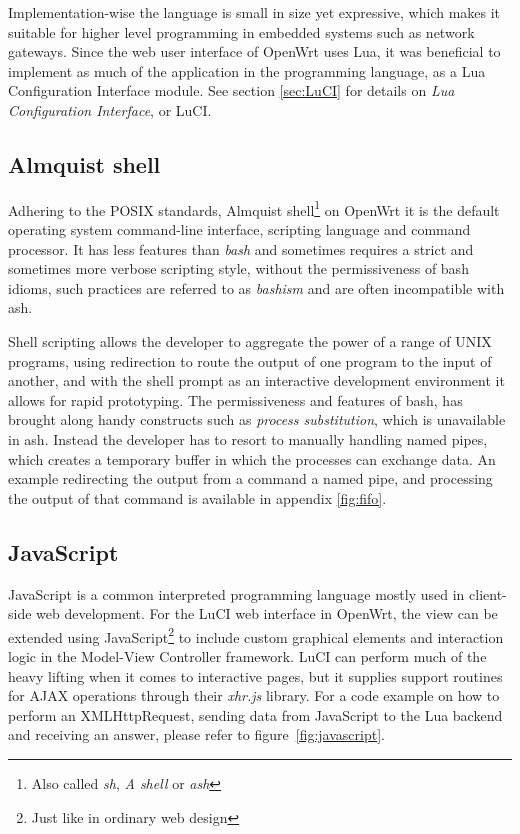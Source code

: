 \documentclass[a4paper,11pt,makeidx]{kth-bcs}
\begin{document}
Implementation-wise the language is small in size yet expressive, which makes it suitable for higher level programming in embedded systems such as network gateways.
Since the web user interface of OpenWrt uses Lua, it was beneficial to implement as much of the application in the programming language, as a Lua Configuration Interface module.
See section \ref{sec:LuCI} for details on \emph{Lua Configuration Interface}, or LuCI.

\subsection{Almquist shell}
Adhering to the POSIX standards, Almquist shell\footnote{Also called \emph{sh}, \emph{A shell} or \emph{ash}} on OpenWrt it is the default operating system command-line interface, scripting language and command processor.
It has less features than \emph{bash} and sometimes requires a strict and sometimes more verbose scripting style, without the permissiveness of bash idioms, such practices are referred to as \emph{bashism} and are often incompatible with ash.

Shell scripting allows the developer to aggregate the power of a range of UNIX programs, using redirection to route the output of one program to the input of another, and with the shell prompt as an interactive development environment it allows for rapid prototyping.
The permissiveness and features of bash, has brought along handy constructs such as \emph{process substitution}, which is unavailable in ash.
Instead the developer has to resort to manually handling named pipes, which creates a temporary buffer in which the processes can exchange data.
An example redirecting the output from a command a named pipe, and processing the output of that command is available in appendix \ref{fig:fifo}.

\subsection{JavaScript}
JavaScript is a common interpreted programming language mostly used in client-side web development.
For the LuCI web interface in OpenWrt, the view can be extended using JavaScript\footnote{Just like in ordinary web design} to include custom graphical elements and interaction logic in the Model-View Controller framework.
LuCI can perform much of the heavy lifting when it comes to interactive pages, but it supplies support routines for AJAX operations through their \emph{xhr.js} library.
For a code example on how to perform an XMLHttpRequest, sending data from JavaScript to the Lua backend and receiving an answer, please refer to figure~\ref{fig:javascript}.
\end{document}
